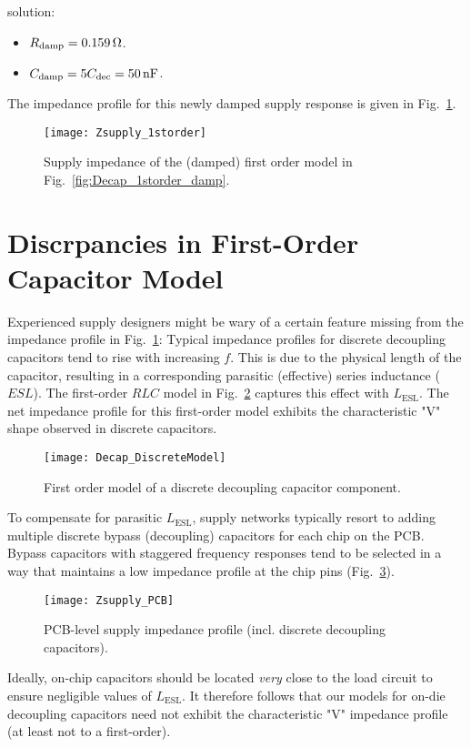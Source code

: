 solution:
\begin{itemize}[noitemsep]
\item $R_\mathrm{damp}=0.159\mathrm{\,\Omega}$.
\item $C_\mathrm{damp}=5 C_\mathrm{dec}=50\mathrm{\,nF}$.
\end{itemize}
%
\par\noindent The impedance profile for this newly damped supply response is
given in Fig.~\ref{fig:Zsupply_1storder}.
\begin{figure}[!ht]
	\centering
	\texttt{[image: Zsupply\_1storder]}
	\caption{Supply impedance of the (damped) first order model in Fig.~\ref{fig:Decap_1storder_damp}.}
\label{fig:Zsupply_1storder}%
\end{figure}
%
\section{Discrpancies in First-Order Capacitor Model}
\par Experienced supply designers might be wary of a certain feature missing from the
impedance profile in Fig.~\ref{fig:Zsupply_1storder}: Typical impedance
profiles for discrete decoupling capacitors tend to rise with increasing $f$.
This is due to the physical length of the capacitor, resulting in a
corresponding parasitic (effective) series inductance ($ESL$).  The first-order
$RLC$ model in Fig.~\ref{fig:Decap_DiscreteModel} captures this effect
with $L_\mathrm{ESL}$. The net impedance profile for this first-order model
exhibits the characteristic "V" shape observed in discrete capacitors.
%
\begin{figure}[!ht]
	\centering
	\texttt{[image: Decap\_DiscreteModel]}
	\caption{First order model of a discrete decoupling capacitor component.}
\label{fig:Decap_DiscreteModel}%
\end{figure}
%
\par To compensate for parasitic $L_\mathrm{ESL}$, supply networks typically
resort to adding multiple discrete bypass (decoupling) capacitors for each chip
on the PCB. Bypass capacitors with staggered frequency responses tend to be
selected in a way that maintains a low impedance profile at the chip pins
(Fig.~\ref{fig:Zsupply_PCB}).
%
\begin{figure}[!ht]
	\centering
	\texttt{[image: Zsupply\_PCB]}
	\caption{PCB-level supply impedance profile (incl. discrete decoupling capacitors).}
\label{fig:Zsupply_PCB}%
\end{figure}
%
\par Ideally, on-chip capacitors should be located \emph{very} close to the
load circuit to ensure negligible values of $L_\mathrm{ESL}$. It
therefore follows that our models for on-die decoupling capacitors need not
exhibit the characteristic "V" impedance profile (at least not to a
first-order).
%
